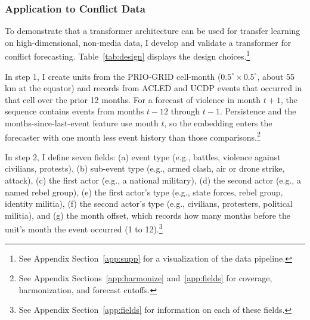 \documentclass[11pt, letterpaper]{article}
\begin{document}
\subsubsection{Application to Conflict Data}
\label{sec:application}
To demonstrate that a transformer architecture can be used for transfer learning on high-dimensional, non-media data, I develop and validate a transformer for conflict forecasting. Table~\ref{tab:design} displays the design choices.\footnote{See Appendix Section~\ref{app:supp} for a visualization of the data pipeline.} 

In step 1, I create units from the PRIO-GRID cell-month ($0.5^\circ \times 0.5^\circ$, about 55 km at the equator) \citep{tollefsen2012priogrid} and records from ACLED \citep{raleigh2010acled} and UCDP \citep{sundberg2013ucdp} events that occurred in that cell over the prior 12 months. For a forecast of violence in month $t+1$, the sequence contains events from months $t-12$ through $t-1$. Persistence and the months-since-last-event feature use month $t$, so the embedding enters the forecaster with one month less event history than those comparisons.\footnote{See Appendix Sections~\ref{app:harmonize} and~\ref{app:fields} for coverage, harmonization, and forecast cutoffs.} 

In step 2, I define seven fields: (a) event type (e.g., battles, violence against civilians, protests), (b) sub-event type (e.g., armed clash, air or drone strike, attack), (c) the first actor (e.g., a national military), (d) the second actor (e.g., a named rebel group), (e) the first actor's type (e.g., state forces, rebel group, identity militia), (f) the second actor's type (e.g., civilians, protesters, political militia), and (g) the month offset, which records how many months before the unit's month the event occurred (1 to 12).\footnote{See Appendix Section~\ref{app:fields} for information on each of these fields.}
\end{document}
